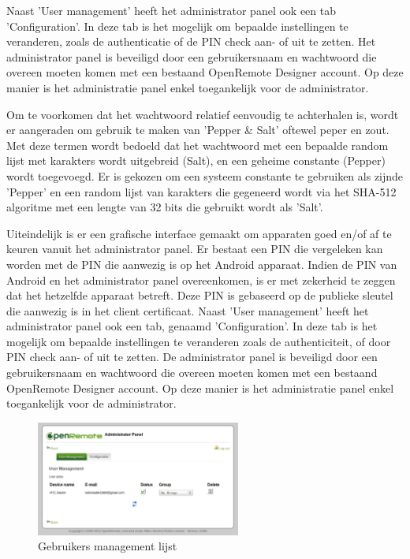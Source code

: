 \documentclass[]{article}
\begin{document}
Naast 'User management' heeft het administrator panel ook een tab
'Configuration'. In deze tab is het mogelijk om bepaalde instellingen te
veranderen, zoals de authenticatie of de PIN check aan- of uit te zetten.  Het
administrator panel is beveiligd door een gebruikersnaam en wachtwoord die
overeen moeten komen met een bestaand OpenRemote Designer account. Op deze manier
is het administratie panel enkel toegankelijk voor de administrator.

Om te voorkomen dat het wachtwoord relatief eenvoudig te achterhalen is, wordt
er aangeraden om gebruik te maken van 'Pepper \& Salt' oftewel peper en zout. Met
deze termen wordt bedoeld dat het wachtwoord met een bepaalde random lijst
met karakters wordt uitgebreid (Salt), en een geheime constante (Pepper) wordt
toegevoegd. Er is gekozen om een systeem constante te gebruiken als zijnde
'Pepper' en een random lijst van karakters die gegeneerd wordt via het SHA-512
algoritme met een lengte van 32 bits die gebruikt wordt als 'Salt'. 

Uiteindelijk is er een grafische interface gemaakt om apparaten goed en/of af te
keuren vanuit het administrator panel. Er bestaat een PIN die vergeleken kan
worden met de PIN die aanwezig is op het Android apparaat. Indien de PIN van
Android en het administrator panel overeenkomen, is er met zekerheid te zeggen
dat het hetzelfde apparaat betreft. Deze PIN is gebaseerd op de publieke sleutel
die aanwezig is in het client certificaat. Naast 'User management' heeft het
administrator panel ook een tab, genaamd 'Configuration'. In deze tab is het
mogelijk om bepaalde instellingen te veranderen zoals de authenticiteit, of door
PIN check aan- of uit te zetten.  De administrator panel is beveiligd door een
gebruikersnaam en wachtwoord die overeen moeten komen met een bestaand
OpenRemote Designer account. Op deze manier is het administratie panel enkel
toegankelijk voor de administrator.

\begin{figure}[htpb]
   \begin{center}
     \includegraphics[width=0.6\textwidth]{userlist.pdf}
   \end{center}
   \label{userlist}
   \caption{Gebruikers management lijst}
\end{figure}
\end{document}
